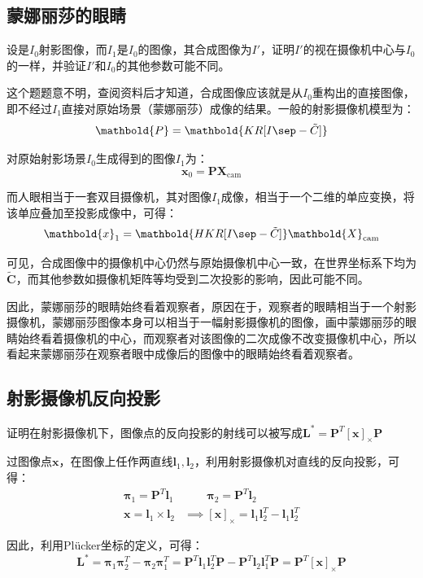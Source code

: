 \documentclass[11pt]{article}
\begin{document}
\subsection{蒙娜丽莎的眼睛}
{\heiti 设是$I_0$射影图像，而$I_1$是$I_0$的图像，其合成图像为$I'$，证明$I'$的视在摄像机中心与$I_0$的一样，并验证$I'$和$I_0$的其他参数可能不同。}\par
这个题题意不明，查阅资料\cite{MultipleViewGeometry}后才知道，合成图像应该就是从$I_0$重构出的直接图像，即不经过$I_1$直接对原始场景（蒙娜丽莎）成像的结果。一般的射影摄像机模型为：
\begin{equation*}
  \mathbold{P}=\mathbold{KR[I\sep -\tilde{C}]}
\end{equation*}\par
对原始射影场景$I_0$生成得到的图像$I_1$为：
\begin{equation*}
  \mathbold{x}_0=\mathbold{P}\mathbold{X}_\mathrm{cam}
\end{equation*}\par
而人眼相当于一套双目摄像机，其对图像$I_1$成像，相当于一个二维的单应变换，将该单应叠加至投影成像中，可得：
\begin{equation*}
  \mathbold{x}_1=\mathbold{HKR[I\sep -\tilde{C}]}\mathbold{X}_\mathrm{cam}
\end{equation*}\par
可见，合成图像中的摄像机中心仍然与原始摄像机中心一致，在世界坐标系下均为$\tilde{\mathbf{C}}$，而其他参数如摄像机矩阵等均受到二次投影的影响，因此可能不同。\par
因此，蒙娜丽莎的眼睛始终看着观察者，原因在于，观察者的眼睛相当于一个射影摄像机，蒙娜丽莎图像本身可以相当于一幅射影摄像机的图像，画中蒙娜丽莎的眼睛始终看着摄像机的中心，而观察者对该图像的二次成像不改变摄像机中心，所以看起来蒙娜丽莎在观察者眼中成像后的图像中的眼睛始终看着观察者。
\subsection{射影摄像机反向投影}
{\heiti 证明在射影摄像机下，图像点的反向投影的射线可以被写成$\mathbf{L}^*=\mathbf{P}^T\mathbf{[x]_\times P}$}\par
过图像点$\mathbf{x}$，在图像上任作两直线$\mathbf{l}_1,\mathbf{l}_2$，利用射影摄像机对直线的反向投影，可得：
\begin{align*}
  \mathbold{\pi}_1=\mathbf{P}^T\mathbf{l}_1 & \qquad\mathbold{\pi}_2=\mathbf{P}^T\mathbf{l}_2                                   \\
  \mathbf{x}=\mathbf{l}_1\times\mathbf{l}_2 & \implies\mathbf{[x]_\times}=\mathbf{l}_1\mathbf{l}_2^T-\mathbf{l}_1\mathbf{l}_2^T
\end{align*}\par
因此，利用Plücker坐标的定义，可得：
\begin{equation*}
  \mathbf{L}^*=\mathbold{\pi}_1\mathbold{\pi}_2^T-\mathbold{\pi}_2\mathbold{\pi}_1^T=\mathbf{P}^T\mathbf{l}_1\mathbf{l}_2^T\mathbf{P}-\mathbf{P}^T\mathbf{l}_2\mathbf{l}_1^T\mathbf{P}=\mathbf{P}^T\mathbf{[x]_\times P}
\end{equation*}\par
\end{document}
